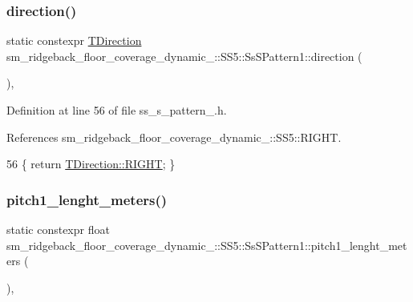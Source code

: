 \subsubsection{\texorpdfstring{direction()}{direction()}}
{\footnotesize\ttfamily static constexpr \hyperlink{namespacesm__ridgeback__floor__coverage__dynamic__1_1_1SS5_ac4b517bcfa16bb73b577c12b354754e5}{T\+Direction} sm\+\_\+ridgeback\+\_\+floor\+\_\+coverage\+\_\+dynamic\+\_\+::\+S\+S5\+::\+Ss\+S\+Pattern1\+::direction (\begin{DoxyParamCaption}{ }\end{DoxyParamCaption})\hspace{0.3cm}{\ttfamily [inline]}, {\ttfamily [static]}}



Definition at line 56 of file ss\+\_\+s\+\_\+pattern\+\_.\+h.



References sm\+\_\+ridgeback\+\_\+floor\+\_\+coverage\+\_\+dynamic\+\_\+::\+S\+S5\+::\+R\+I\+G\+HT.


\begin{DoxyCode}
56 \{ \textcolor{keywordflow}{return} \hyperlink{namespacesm__ridgeback__floor__coverage__dynamic__1_1_1SS5_ac4b517bcfa16bb73b577c12b354754e5a21507b40c80068eda19865706fdc2403}{TDirection::RIGHT}; \}
\end{DoxyCode}
\mbox{\label{structsm__ridgeback__floor__coverage__dynamic__1_1_1SS5_1_1SsSPattern1_a5ce4d6025eb7658f93d15dd677f8481d}} 
\subsubsection{\texorpdfstring{pitch1\+\_\+lenght\+\_\+meters()}{pitch1\_lenght\_meters()}}
{\footnotesize\ttfamily static constexpr float sm\+\_\+ridgeback\+\_\+floor\+\_\+coverage\+\_\+dynamic\+\_\+::\+S\+S5\+::\+Ss\+S\+Pattern1\+::pitch1\+\_\+lenght\+\_\+meters (\begin{DoxyParamCaption}{ }\end{DoxyParamCaption})\hspace{0.3cm}{\ttfamily [inline]}, {\ttfamily [static]}}



